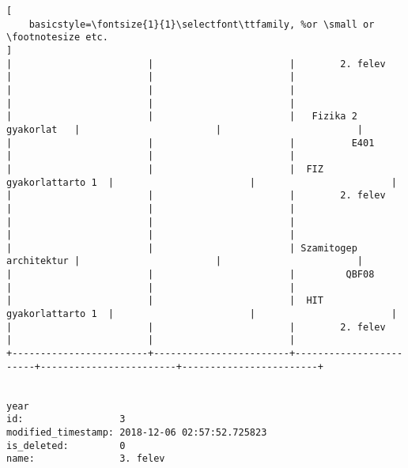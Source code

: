 \begin{lstlisting}[
    basicstyle=\fontsize{1}{1}\selectfont\ttfamily, %or \small or \footnotesize etc.
]
|                        |                        |        2. felev        |                        |                        | 
|                        |                        |                        |                        |                        | 
|                        |                        |   Fizika 2 gyakorlat   |                        |                        | 
|                        |                        |          E401          |                        |                        | 
|                        |                        |  FIZ gyakorlattarto 1  |                        |                        | 
|                        |                        |        2. felev        |                        |                        | 
|                        |                        |                        |                        |                        | 
|                        |                        | Szamitogep architektur |                        |                        | 
|                        |                        |         QBF08          |                        |                        | 
|                        |                        |  HIT gyakorlattarto 1  |                        |                        | 
|                        |                        |        2. felev        |                        |                        | 
+------------------------+------------------------+------------------------+------------------------+------------------------+


year                
id:                 3
modified_timestamp: 2018-12-06 02:57:52.725823
is_deleted:         0
name:               3. felev


\end{lstlisting}
